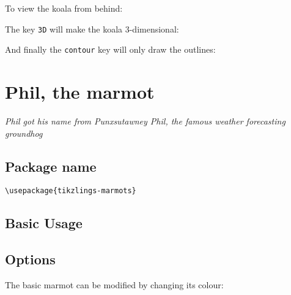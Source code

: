 \documentclass[parskip=half]{scrartcl}
\begin{document}
To view the koala from behind:
\begin{tcblisting}{}
\koala[back]
\end{tcblisting}

The key \lstinline|3D| will make the koala 3-dimensional:
\begin{tcblisting}{}
\koala[3D]
\end{tcblisting}

And finally the \lstinline|contour| key will only draw the outlines:
\begin{tcblisting}{}
\koala[contour=black]
\end{tcblisting}

%
%
\clearpage
\section[Marmot]{Phil, the marmot}

\emph{Phil got his name from Punxsutawney Phil, the famous weather forecasting groundhog}

\subsection{Package name}

\begin{tcolorbox}[lower separated=false, lefthand width=.8\linewidth]
\vspace*{0.5cm}
\lstinline|\usepackage{tikzlings-marmots}| 
\vspace*{0.5cm}
\end{tcolorbox}

\subsection{Basic Usage}

\begin{tcblisting}{}
\marmot
\end{tcblisting}

\subsection{Options}

The basic marmot can be modified by changing its colour:
\begin{tcblisting}{}
\marmot[body=blue]
\end{tcblisting}
\end{document}
